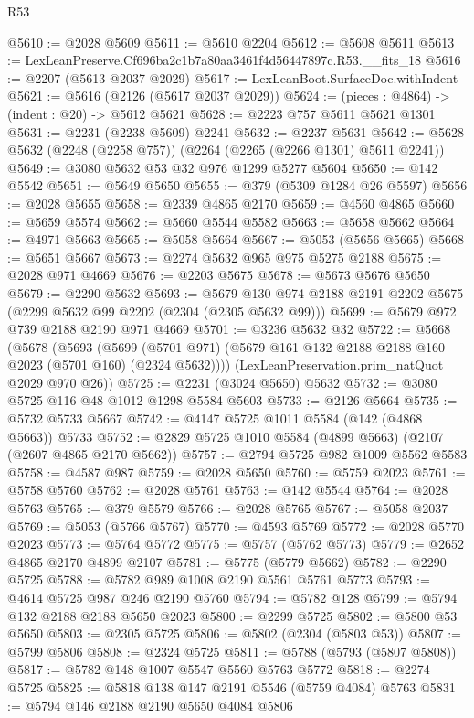 \begin{lexlean}{R53}
\begin{coremodule}
@5610 := @2028 @5609
@5611 := @5610 @2204
@5612 := @5608 @5611
@5613 := LexLeanPreserve.Cf696ba2c1b7a80aa3461f4d56447897c.R53.__fits_18
@5616 := @2207 (@5613 @2037 @2029)
@5617 := LexLeanBoot.SurfaceDoc.withIndent
@5621 := @5616 (@2126 (@5617 @2037 @2029))
@5624 := (pieces : @4864) -> (indent : @20) -> @5612 @5621
@5628 := @2223 @757 @5611 @5621 @1301
@5631 := @2231 (@2238 @5609) @2241
@5632 := @2237 @5631
@5642 := @5628 @5632 (@2248 (@2258 @757)) (@2264 (@2265 (@2266 @1301) @5611 @2241))
@5649 := @3080 @5632 @53 @32 @976 @1299 @5277 @5604
@5650 := @142 @5542
@5651 := @5649 @5650
@5655 := @379 (@5309 @1284 @26 @5597)
@5656 := @2028 @5655
@5658 := @2339 @4865 @2170
@5659 := @4560 @4865
@5660 := @5659 @5574
@5662 := @5660 @5544 @5582
@5663 := @5658 @5662
@5664 := @4971 @5663
@5665 := @5058 @5664
@5667 := @5053 (@5656 @5665)
@5668 := @5651 @5667
@5673 := @2274 @5632 @965 @975 @5275 @2188
@5675 := @2028 @971 @4669
@5676 := @2203 @5675
@5678 := @5673 @5676 @5650
@5679 := @2290 @5632
@5693 := @5679 @130 @974 @2188 @2191 @2202 @5675 (@2299 @5632 @99 @2202 (@2304 (@2305 @5632 @99)))
@5699 := @5679 @972 @739 @2188 @2190 @971 @4669
@5701 := @3236 @5632 @32
@5722 := @5668
    (@5678
      (@5693
        (@5699 (@5701 @971) (@5679 @161 @132 @2188 @2188 @160 @2023 (@5701 @160) (@2324 @5632))))
      (LexLeanPreservation.prim_natQuot @2029 @970 @26))
@5725 := @2231 (@3024 @5650) @5632
@5732 := @3080 @5725 @116 @48 @1012 @1298 @5584 @5603
@5733 := @2126 @5664
@5735 := @5732 @5733 @5667
@5742 := @4147 @5725 @1011 @5584 (@142 (@4868 @5663)) @5733
@5752 := @2829 @5725 @1010 @5584 (@4899 @5663) (@2107 (@2607 @4865 @2170 @5662))
@5757 := @2794 @5725 @982 @1009 @5562 @5583
@5758 := @4587 @987
@5759 := @2028 @5650
@5760 := @5759 @2023
@5761 := @5758 @5760
@5762 := @2028 @5761
@5763 := @142 @5544
@5764 := @2028 @5763
@5765 := @379 @5579
@5766 := @2028 @5765
@5767 := @5058 @2037
@5769 := @5053 (@5766 @5767)
@5770 := @4593 @5769
@5772 := @2028 @5770 @2023
@5773 := @5764 @5772
@5775 := @5757 (@5762 @5773)
@5779 := @2652 @4865 @2170 @4899 @2107
@5781 := @5775 (@5779 @5662)
@5782 := @2290 @5725
@5788 := @5782 @989 @1008 @2190 @5561 @5761 @5773
@5793 := @4614 @5725 @987 @246 @2190 @5760
@5794 := @5782 @128
@5799 := @5794 @132 @2188 @2188 @5650 @2023
@5800 := @2299 @5725
@5802 := @5800 @53 @5650
@5803 := @2305 @5725
@5806 := @5802 (@2304 (@5803 @53))
@5807 := @5799 @5806
@5808 := @2324 @5725
@5811 := @5788 (@5793 (@5807 @5808))
@5817 := @5782 @148 @1007 @5547 @5560 @5763 @5772
@5818 := @2274 @5725
@5825 := @5818 @138 @147 @2191 @5546 (@5759 @4084) @5763
@5831 := @5794 @146 @2188 @2190 @5650 @4084 @5806

\end{coremodule}
\end{lexlean}
